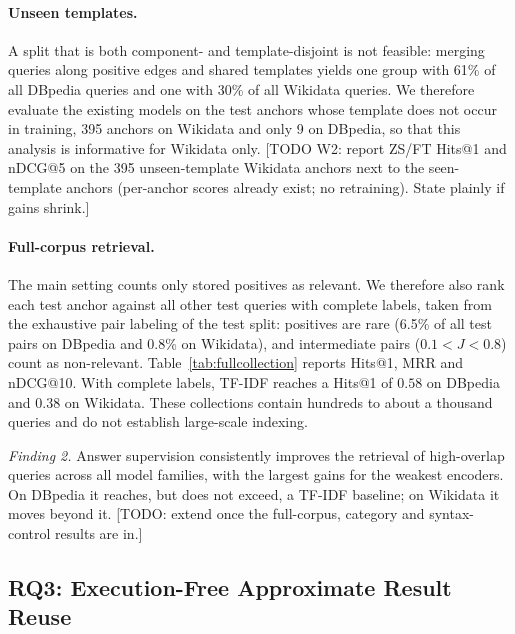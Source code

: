 \documentclass[runningheads]{llncs}
\newcommand{\hp}[1]{{\color{red!75!black}#1}}
\begin{document}
\paragraph{Unseen templates.}
A split that is both component- and template-disjoint is not feasible: merging
queries along positive edges and shared templates yields one group with 61\%
of all DBpedia queries and one with 30\% of all Wikidata queries. We therefore
evaluate the existing models on the test anchors whose template does not occur
in training, 395 anchors on Wikidata and only 9 on DBpedia, so that this
analysis is informative for Wikidata only.
\hp{[TODO W2: report ZS/FT Hits@1 and nDCG@5 on the 395 unseen-template Wikidata
anchors next to the seen-template anchors (per-anchor scores already exist; no
retraining). State plainly if gains shrink.]}

\paragraph{Full-corpus retrieval.}
The main setting counts only stored positives as relevant. We therefore
also rank each test anchor against all other test queries with complete
labels, taken from the exhaustive pair labeling of the test split: positives
are rare (6.5\% of all test pairs on DBpedia and 0.8\% on Wikidata), and
intermediate pairs ($0.1 < J < 0.8$) count as non-relevant.
Table~\ref{tab:fullcollection} reports Hits@1, MRR and nDCG@10. With
complete labels, TF-IDF reaches a Hits@1 of $0.58$ on DBpedia and $0.38$ on
Wikidata. These collections contain hundreds to about a thousand queries and
do not establish large-scale indexing.


\textit{Finding 2.} Answer supervision consistently improves the
retrieval of high-overlap queries across all model families, with the
largest gains for the weakest encoders. On DBpedia it reaches, but does
not exceed, a TF-IDF baseline; on Wikidata it moves beyond it.
\hp{[TODO: extend once the full-corpus, category and syntax-control results
are in.]}

\subsection{RQ3: Execution-Free Approximate Result Reuse}
\label{sec:caching}
\end{document}
